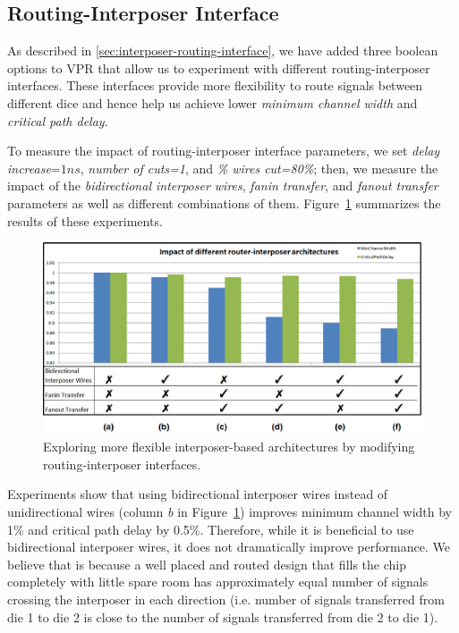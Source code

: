 \documentclass{sig-alternate-2013}
\begin{document}
\subsection{Routing-Interposer Interface}
As described in \ref{sec:interposer-routing-interface}, we have added three boolean options to VPR that allow us to experiment with different routing-interposer interfaces. These interfaces provide more flexibility to route signals between different dice and hence help us achieve lower \textit{minimum channel width} and \textit{critical path delay}.

To measure the impact of routing-interposer interface parameters, we set \textit{delay increase}=$1ns$, \textit{number of cuts=1}, and \textit{\% wires cut=80\%}; then, we measure the impact of the \textit{bidirectional interposer wires}, \textit{fanin transfer}, and \textit{fanout transfer} parameters as well as different combinations of them. Figure~\ref{fig:all_arch_experiments} summarizes the results of these experiments.

\begin{figure}[!h]
\centering
\includegraphics[width=\linewidth]{arch_experiments.eps}
\caption{Exploring more flexible interposer-based architectures by modifying routing-interposer interfaces.}
\label{fig:all_arch_experiments}
\end{figure}

Experiments show that using bidirectional interposer wires instead of unidirectional wires (column \textit{b} in Figure~\ref{fig:all_arch_experiments}) improves minimum channel width by 1\% and critical path delay by 0.5\%. Therefore, while it is beneficial to use bidirectional interposer wires, it does not dramatically improve performance. We believe that is because a well placed and routed design that fills the chip completely with little spare room has approximately equal number of signals crossing the interposer in each direction (i.e. number of signals transferred from die 1 to die 2 is close to the number of signals transferred from die 2 to die 1).
\end{document}
